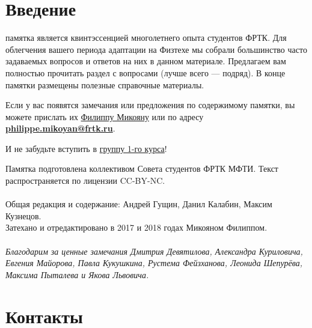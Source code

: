 \documentclass[14pt]{extarticle}
\newenvironment{bottompar}{\par\vspace*{\fill}}{\clearpage}
\begin{document}
\clearpage
\section{Введение}
 памятка является квинтэссенцией многолетнего опыта студентов ФРТК.
Для облегчения вашего периода адаптации на Физтехе мы собрали большинство
часто задаваемых вопросов и ответов на них в данном материале. Предлагаем
вам полностью прочитать раздел с вопросами (лучше всего — подряд). В конце
памятки размещены полезные справочные материалы.

Если у вас появятся замечания или предложения по содержимому памятки, вы
можете прислать их \href{https://vk.com/philalala}{Филиппу Микояну} или по адресу \underline{\textbf{philippe.mikoyan@frtk.ru}}.

И не забудьте вступить в \href{https://vk.com/drec_81x}{группу 1-го курса}!
\begin{bottompar}

Памятка подготовлена коллективом Совета студентов ФРТК МФТИ.
Текст распространяется по лицензии CC-BY-NC.
\\ \\
Общая редакция и содержание: Андрей Гущин, Данил Калабин, Максим Кузнецов.
\\
Затехано и отредактировано в 2017 и 2018 годах Микояном Филиппом.
\\ \\
    \textit{Благодарим за ценные замечания Дмитрия Девятилова, Александра Куриловича, Евгения Майорова, Павла Кукушкина, Рустема Фейзханова, Леонида Шепурёва, Максима Пыталева и Якова Львовича.}

\end{bottompar}
\clearpage
\section{Контакты}
\end{document}
